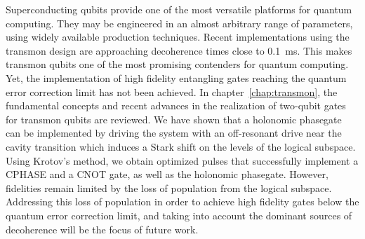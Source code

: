 Superconducting qubits provide one of the most versatile platforms for quantum
computing. They may be engineered in an almost arbitrary range of parameters,
using widely available production techniques. Recent implementations using
the transmon design are approaching decoherence times close to \SI{0.1}{ms}.
This makes transmon qubits one of the most promising contenders for quantum
computing. Yet, the implementation of high fidelity entangling gates reaching
the quantum error correction limit has not been achieved. In
chapter~\ref{chap:transmon}, the fundamental concepts and recent advances in the
realization of two-qubit gates for transmon qubits are reviewed. We have shown that
a holonomic phasegate can be implemented by driving the system with an
off-resonant drive near the cavity transition which induces a Stark shift on the
levels of the logical subspace. Using Krotov's method, we obtain optimized
pulses that successfully implement a CPHASE and a CNOT gate, as well as the
holonomic phasegate. However, fidelities remain limited by the loss of
population from the logical subspace. Addressing this loss of population in
order to achieve high fidelity gates below the quantum error correction limit,
and taking into account the dominant sources of decoherence
will be the focus of future work.

